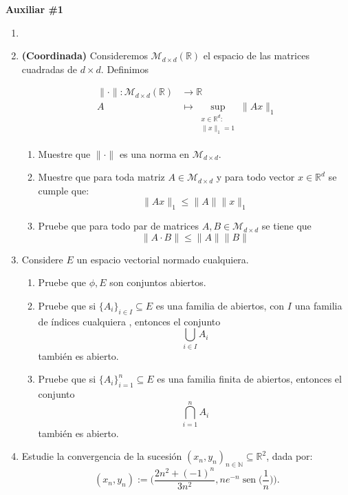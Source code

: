 \documentclass[letterpaper,11pt]{article}
\DeclareMathOperator{\sen}{sen}
\let\max=\undefined\DeclareMathOperator*{\max}{\text{máx}}
\newcommand{\N}{\mathbb{N}}
\newcommand{\R}{\mathbb{R}}
\newcommand{\norm}[1]{\lVert #1\rVert }
\newcommand{\vabs}[1]{\lvert #1\rvert}
\begin{document}
\begin{center}
	\LARGE \bf{Auxiliar \#1}\\
\end{center}

\vspace{-1cm}
\begin{enumerate}\setlength{\itemsep}{0.4cm}	
\item[]


\item \textbf{(Coordinada)} Consideremos $\mathcal{M}_{d\times d}(\R)$ el espacio de las matrices cuadradas de $d\times d$. Definimos

\begin{align*}
\norm{\cdot} : \mathcal{M}_{d\times d}(\R)&\to\R\\
A & \mapsto \sup_{\substack{x\in\R^d :\\
                  \norm{x}_1=1}}\norm{Ax}_1
\end{align*}



\begin{enumerate}





\item Muestre que $\norm{\cdot}$ es una norma en $\mathcal{M}_{d\times d}$.
\item Muestre que para toda matriz $A\in\mathcal{M}_{d\times d}$ y para todo vector $x\in \R^d$ se cumple que:
\[\norm{Ax}_{1}\leq \norm{A}\norm{x}_1\]
\item Pruebe que para todo par de matrices $A,B\in\mathcal{M}_{d \times d}$ se tiene que
\[\norm{A\cdot B}\leq \norm{A}\norm{B}\]
\end{enumerate}	

\item Considere $E$ un espacio vectorial normado cualquiera.
\begin{enumerate}
    \item Pruebe que $\phi, E$ son conjuntos abiertos.
    \item Pruebe que si $\{A_i\}_{i\in I}\subseteq E$ es una familia de abiertos, con $I$ una familia de índices cualquiera , entonces el conjunto
    \[\bigcup_{i\in I}A_i\]
    también es abierto.
    \item Pruebe que si $\{A_i\}_{i=1}^n\subseteq E$ es una familia finita de abiertos, entonces el conjunto
    \[\bigcap_{i=1}^nA_i\]
    también es abierto.
\end{enumerate}

\item Estudie la convergencia de la sucesión $(x_n,y_n)_{n\in\N}\subseteq \R^2$, dada por:
\[(x_n,y_n):=\bigg(\frac{2n^2+(-1)^n}{3n^2},ne^{-n}\sen\bigg(\frac{1}{n}\bigg)\bigg).\]



\end{enumerate}	
\end{document}
